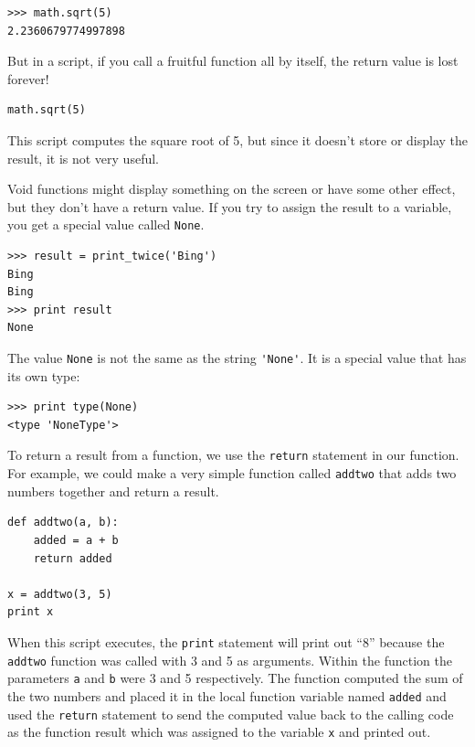 \documentclass[10pt]{book}
\begin{document}
\beforeverb
\begin{verbatim}
>>> math.sqrt(5)
2.2360679774997898
\end{verbatim}
\afterverb
%
But in a script, if you call a fruitful function all by itself,
the return value is lost forever!

\beforeverb
\begin{verbatim}
math.sqrt(5)
\end{verbatim}
\afterverb
%
This script computes the square root of 5, but since it doesn't store
or display the result, it is not very useful.


Void functions might display something on the screen or have some
other effect, but they don't have a return value.  If you try to
assign the result to a variable, you get a special value called
{\tt None}.


\beforeverb
\begin{verbatim}
>>> result = print_twice('Bing')
Bing
Bing
>>> print result
None
\end{verbatim}
\afterverb
%
The value {\tt None} is not the same as the string \verb"'None'". 
It is a special value that has its own type:

\beforeverb
\begin{verbatim}
>>> print type(None)
<type 'NoneType'>
\end{verbatim}
\afterverb
%
To return a result from a function, we use the {\tt return} statement 
in our function.  For example, we could make a very 
simple function called {\tt addtwo}
that adds two numbers together and return a result.

\beforeverb
\begin{verbatim}
def addtwo(a, b):
    added = a + b
    return added

x = addtwo(3, 5)
print x
\end{verbatim}
\afterverb
%
When this script executes, the {\tt print} statement will print out ``8''
because the {\tt addtwo} function was called with 3 and 5 as arguments.
Within the function the parameters {\tt a} and {\tt b} were 3 and 5 
respectively. The function computed the sum of the two numbers and placed
it in the local function variable named {\tt added} 
and used the {\tt return} statement 
to send the computed value back to the calling code 
as the function result which was assigned
to the variable {\tt x} and printed out.
\end{document}
